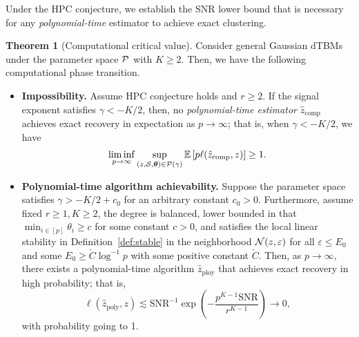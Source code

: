 \documentclass[journal]{IEEEtran}
\theoremstyle{definition}
\newtheorem{thm}{Theorem}
\theoremstyle{definition}
\newcommand{\of}[1]{\left(#1\right)}
\begin{document}
Under the HPC conjecture, we establish the SNR lower bound that is necessary for any \emph{polynomial-time} estimator to achieve exact clustering.

\begin{thm}[Computational critical value]\label{thm:comp} 
Consider general Gaussian dTBMs under the parameter space $\mathcal{P}$ with $K\geq 2$. Then, we have the following computational phase transition.

\begin{itemize}[wide]
    \item \textbf{Impossibility.} Assume HPC conjecture holds {and $r \geq 2$}. If the signal exponent satisfies $\gamma < -K/2$, then, no \emph{polynomial-time estimator} $\hat z_{\text{comp}}$ achieves exact recovery in expectation as $p\to \infty$; that is, when $\gamma<-K/2$, we have 
\begin{align}
   \liminf_{p\to \infty}\sup_{(z, \mathcal{S}, \boldsymbol{\theta}) \in \mathcal{P}(\gamma)}  \mathbb{E} \left[ p\ell(\hat z_{\text{comp}}, z) \right]\geq 1.
\end{align}
\item \textbf{Polynomial-time algorithm achievability.} Suppose the parameter space satisfies $\gamma  >  -K/2+c_0$ for an arbitrary constant {$c_0>0$}. Furthermore, assume {fixed $r \geq 1, K \geq 2$,} the degree is balanced, lower bounded in that $\min_{i\in[p]}\theta_i\geq c$ for some constant $c>0$, and satisfies the local linear stability in Definition~\ref{def:stable} {in the neighborhood $\mathcal{N}(z,\varepsilon)$ for all $\varepsilon \leq E_0$ and some $E_0 \geq \check{C}\log^{-1}p $ with some positive constant $\check{C}$.}
Then, {as $p \rightarrow \infty$}, there exists a polynomial-time algorithm $\hat z_{\text{ploy}}$ that achieves exact recovery in high probability; that is,
\begin{equation}
 \ell(\hat z_{\text{poly}}, z) \lesssim \text{SNR}^{-1}\exp \of{ - \frac{p^{K-1}\text{SNR}}{r^{K-1}} } \to 0,
\end{equation}
with probability going to 1. 
\end{itemize}
\end{thm}
\end{document}
